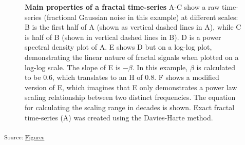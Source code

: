 \documentclass[
  sn-vancouver,
  Numbered,
  referee,
  lineno]{sn-jnl}
\begin{document}
\begin{figure}[H]


\caption{\label{fig-fourprop}\textbf{Main properties of a fractal
time-series} A-C show a raw time-series (fractional Gaussian noise in
this example) at different scales: B is the first half of A (shown as
vertical dashed lines in A), while C is half of B (shown in vertical
dashed lines in B). D is a power spectral density plot of A. E shows D
but on a log-log plot, demonstrating the linear nature of fractal
signals when plotted on a log-log scale. The slope of E is \(-\beta\).
In this example, \(\beta\) is calculated to be 0.6, which translates to
an H of 0.8. F shows a modified version of E, which imagines that E only
demonstrates a power law scaling relationship between two distinct
frequencies. The equation for calculating the scaling range in decades
is shown. Exact fractal time-series (A) was created using the
Davies-Harte method.}

\end{figure}%

\textsubscript{Source:
\href{https://WeberLab.github.io/Hurst_LitReview/notebooks/Figures-preview.html\#cell-fig-fourprop}{Figures}}
\end{document}
